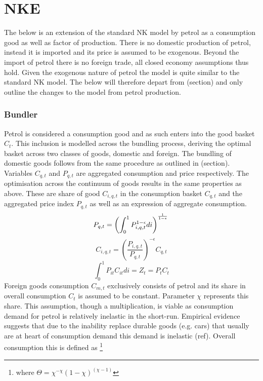 \documentclass[12pt,a4paper,english]{article} %
\let\oldsection\section
\renewcommand\section{\clearpage\oldsection}
\begin{document}

	\section{NKE}
	The below is an extension of the standard NK model by petrol as a consumption good as well as factor of production. There is no domestic production of petrol, instead it is imported and its price is assumed to be exogenous. Beyond the import of petrol there is no foreign trade, all closed economy assumptions thus hold. 
	Given the exogenous nature of petrol the model is quite similar to the standard NK model. The below will therefore depart from (section) and only outline the changes to the model from petrol production. 	
	
	\subsubsection{Bundler}
	Petrol is considered a consumption good and as such enters into the good basket $C_t$. This inclusion is modelled across the bundling process, deriving the optimal basket across two classes of goods, domestic and foreign. 
	The bundling of domestic goods follows from the same procedure as outlined in (section). Variables $C_{q,t}$ and $P_{q,t}$ are aggregated consumption and price respectively. The optimisation across the continuum of goods results in the same properties as above. These are share of good $C_{i,q,t}$ in the consumption basket $C_{q,t}$ and the aggregated price index $P_{q,t}$ as well as an expression of aggregate consumption. \\
	\begin{equation} \label{eq:o_pindex}
		P_{q,t} = \left( \int_{0}^{1} P_{i,q,t}^{1 - \epsilon} di \right)^{\frac{1}{1-\epsilon}} \\
	\end{equation}
	\begin{equation} \label{eq:o_cshare}
		C_{i,q,t} = \left( \frac{P_{i,q,t}}{P_{q,t}} \right)^{-\epsilon} C_{q,t}
	\end{equation}
	\begin{equation} \label{eq:o_pcon}
		\int_{0}^{1} P_{it} C_{it} di = Z_t = P_t C_t
	\end{equation}
	Foreign goods consumption $C_{m,t}$ exclusively consists of petrol and its share in overall consumption $C_t$ is assumed to be constant. Parameter $\chi$ represents this share. 
	This assumption, though a multiplication, is viable as consumption demand for petrol is relatively inelastic in the short-run. Empirical evidence suggests that due to the inability replace durable goods (e.g. cars) that usually are at heart of consumption demand this demand is inelastic (ref). Overall consumption this is defined as \footnote{where $\Theta = \chi^{-\chi}(1-\chi)^{(\chi-1)}$}
\end{document}
